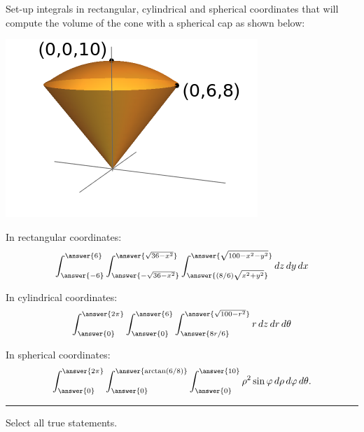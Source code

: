 \documentclass{ximera}
\author{Bart Snapp}
\begin{document}
Set-up integrals in rectangular, cylindrical and spherical coordinates
that will compute the volume of the cone with a spherical cap as shown below:
\begin{image}
  \includegraphics{coneWithCap6-8-10.png}
\end{image}

\begin{problem}
  In rectangular coordinates:
  \[
  \int_{\answer{-6}}^{\answer{6}} \int_{\answer{-\sqrt{36-x^2}}}^{\answer{\sqrt{36-x^2}}} \int_{\answer{(8/6)\sqrt{x^2+y^2}}}^{\answer{\sqrt{100-x^2-y^2}}} \d z \d y \d x
  \]
\end{problem}

\begin{problem}
  In cylindrical coordinates:
  \[
  \int_{\answer{0}}^{\answer{2\pi}} \int_{\answer{0}}^{\answer{6}} \int_{\answer{8r/6}}^{\answer{\sqrt{100-r^2}}} r \d z \d r \d \theta
  \]
\end{problem}


\begin{problem}
  In spherical coordinates:
  \[
  \int_{\answer{0}}^{\answer{2\pi}} \int_{\answer{0}}^{\answer{\arctan(6/8)}} \int_{\answer{0}}^{\answer{10}} \rho^2 \sin \varphi \d \rho \d \varphi \d\theta.
  \]
\end{problem}

\vfill

\hrule

\begin{problem}
  \begin{prompt}
    Select all true statements.
  \end{prompt}
  \begin{selectAll}




  \end{selectAll}
\end{problem}
\end{document}
